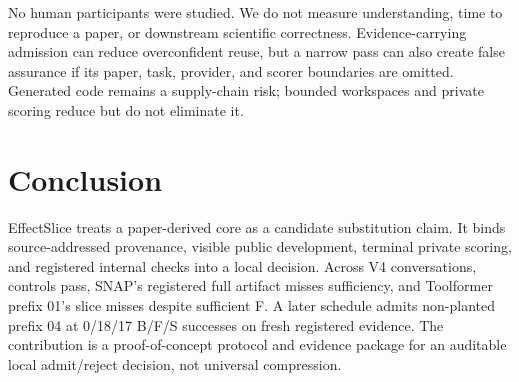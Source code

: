 \documentclass[letterpaper]{article} %
\begin{document}
No human participants were studied.  We do not measure understanding, time to
reproduce a paper, or downstream scientific correctness.  Evidence-carrying
admission can reduce overconfident reuse, but a narrow pass can also create false
assurance if its paper, task, provider, and scorer boundaries are omitted.
Generated code remains a supply-chain risk; bounded workspaces and private
scoring reduce but do not eliminate it.

\section{Conclusion}

EffectSlice treats a paper-derived core as a candidate substitution claim.  It
binds source-addressed provenance, visible public development, terminal private
scoring, and registered internal checks into a local decision.  Across
\VFourProviderConversations{} V4
conversations, controls pass, SNAP's registered full artifact misses sufficiency,
and Toolformer prefix 01's slice misses despite sufficient F.  A later schedule
admits non-planted prefix 04 at 0/18/17 B/F/S successes on fresh registered
evidence.  The contribution is a proof-of-concept protocol and evidence package
for an auditable local admit/reject decision, not universal compression.


\end{document}
